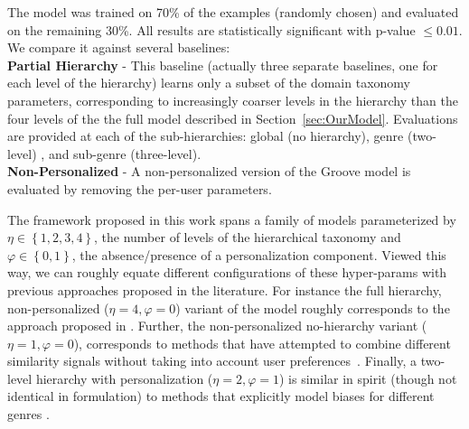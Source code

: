 The model was trained on 70\% of the examples (randomly chosen) and evaluated on the remaining 30\%. 
All results are statistically significant with p-value $\leq 0.01$.
We compare it against several baselines:\\
{\bf Partial Hierarchy} - This baseline (actually three separate baselines, one for each level of the hierarchy)  learns only a subset of the domain taxonomy parameters, corresponding to increasingly coarser levels in the hierarchy than the four levels of the the full model described in Section~\ref{sec:OurModel}. Evaluations are provided at each of the sub-hierarchies: global (no hierarchy), genre (two-level) , and sub-genre (three-level).\\
{\bf Non-Personalized} - A non-personalized version of the Groove model is evaluated by removing the per-user parameters.%

 The framework proposed in this work spans a family of models parameterized by $\eta\in\left\{1,2,3,4\right\}$, the number of levels of the hierarchical taxonomy and $\varphi\in\left\{0,1\right\}$, the absence/presence of a personalization component. Viewed this way, we can roughly equate different configurations of these hyper-params with previous approaches proposed in the literature. For instance the full hierarchy, non-personalized ($\eta=4,\varphi=0$) variant of the model roughly corresponds to the approach proposed in \cite{NIPS2012_4609}. Further, the non-personalized no-hierarchy variant ($\eta=1,\varphi=0$), corresponds to methods that have attempted to combine different similarity signals without taking into account user preferences~\cite{Knees:2006,McFee_multi_similarities}. Finally, a two-level hierarchy with personalization  ($\eta=2,\varphi=1$) is similar in spirit (though not identical in formulation) to methods that explicitly model biases for different genres \cite{Dror2011,Mnih2012}.

